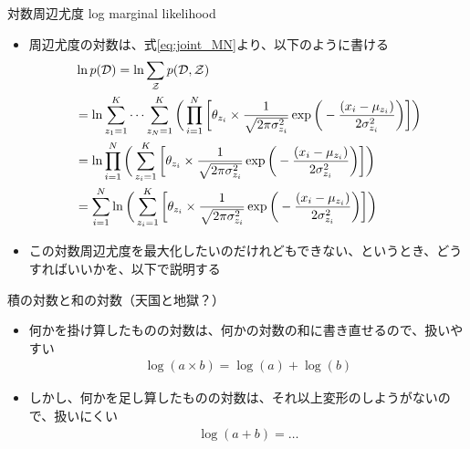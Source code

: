 \documentclass[aspectratio=169,unicode,dvipdfmx,14pt]{beamer}
\begin{document}
\begin{frame}{対数周辺尤度 log marginal likelihood}
\begin{itemize}
\item 周辺尤度の対数は、式\eqref{eq:joint_MN}より、以下のように書ける
\vspace{-.1in}
\begin{align}
& \ln p(\mathcal{D}) = \ln \sum_{\mathcal{Z}} p(\mathcal{D}, \mathcal{Z})
\notag \\ &
= \ln \sum_{z_1=1}^K \cdots \sum_{z_N=1}^K \bigg( \prod_{i=1}^N \bigg[ \theta_{z_i} \times \frac{1}{\sqrt{2\pi\sigma_{z_i}^2}}\exp\bigg( - \frac{(x_i - \mu_{z_i})}{2\sigma_{z_i}^2} \bigg) \bigg] \bigg)
\notag \\ &
= \ln \prod_{i=1}^N \bigg( \sum_{z_i=1}^K \bigg[ \theta_{z_i} \times \frac{1}{\sqrt{2\pi\sigma_{z_i}^2}}\exp\bigg( - \frac{(x_i - \mu_{z_i})}{2\sigma_{z_i}^2} \bigg) \bigg] \bigg)
\notag \\ &
= \sum_{i=1}^N \ln \bigg( \sum_{z_i=1}^K \bigg[ \theta_{z_i} \times \frac{1}{\sqrt{2\pi\sigma_{z_i}^2}}\exp\bigg( - \frac{(x_i - \mu_{z_i})}{2\sigma_{z_i}^2} \bigg) \bigg] \bigg)
\end{align}
\item この対数周辺尤度を最大化したいのだけれどもできない、というとき、どうすればいいかを、以下で説明する
\end{itemize}
\end{frame}

\begin{frame}{積の対数と和の対数（天国と地獄？）}
\begin{itemize}
\item 何かを掛け算したものの対数は、何かの対数の和に書き直せるので、扱いやすい
\begin{align}
\log(a \times b) = \log(a) + \log(b)
\end{align}
\item しかし、何かを足し算したものの対数は、それ以上変形のしようがないので、扱いにくい
\begin{align}
\log(a + b) = \ldots
\end{align}\end{itemize}
\end{frame}
\end{document}
